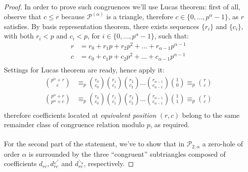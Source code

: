 \begin{proof}
  In order to prove such congruences we'll use Lucas theorem:
  first of all, observe that $c \leq r$ because $\mathcal{P}^{(\alpha)}$ 
  is a triangle, therefore $c \in \lbrace 0, \ldots, p^{\alpha} -1 \rbrace$,
  as $r$ satisfies.  By basis representation theorem, there exists
  sequences $\lbrace r_i\rbrace$ and $\lbrace c_i\rbrace$, 
  with both $r_i< p$ and $c_i < p$, for $i \in \lbrace 0, \ldots, p^{\alpha} -1 \rbrace$,
  such that:
  \begin{displaymath}
    \begin{split}
      r &= r_0 + r_1 p + r_2 p^2 + \ldots + r_{{\alpha}-1}p^{{\alpha}-1} \\
      c &= c_0 + c_1 p + c_2 p^2 + \ldots + c_{{\alpha}-1}p^{{\alpha}-1} \\
    \end{split}
  \end{displaymath}
  Settings for Lucas theorem are ready, hence apply it:
  \begin{displaymath}
    \begin{split}
      {{p^{\alpha}+r} \choose {c}} &\equiv_{p} {{r_0} \choose {c_0}} {{r_1} \choose {c_1}}{{r_2} \choose {c_2}} \ldots 
      {{r_{{\alpha}-1}} \choose {c_{{\alpha}-1}}}{{1} \choose {0}} \equiv_{p} {{r} \choose {c}}\\
      {{p^{\alpha}+r} \choose {p^{\alpha}+c}} &\equiv_{p} {{r_0} \choose {c_0}} {{r_1} \choose {c_1}}{{r_2} \choose {c_2}} \ldots 
      {{r_{{\alpha}-1}} \choose {c_{{\alpha}-1}}}{{1} \choose {1}} \equiv_{p} {{r} \choose {c}}\\
    \end{split}
  \end{displaymath}
  therefore coefficients located at \emph{equivalent position} 
  $(r,c)$ belong to the same remainder class of congruence relation
  modulo $p$, as required.
  \\\\

  For the second part  of the statement, we've to show that in
  $\mathcal{P}_{2;\alpha}$ a zero-hole of order $\alpha$ is
  surrounded by the three ``congruent'' subtriangles composed of
  coefficients $d_{rc}, d_{rc}^{\swarrow}$ and $d_{rc}^{\searrow} $, respectively.


\end{proof}
